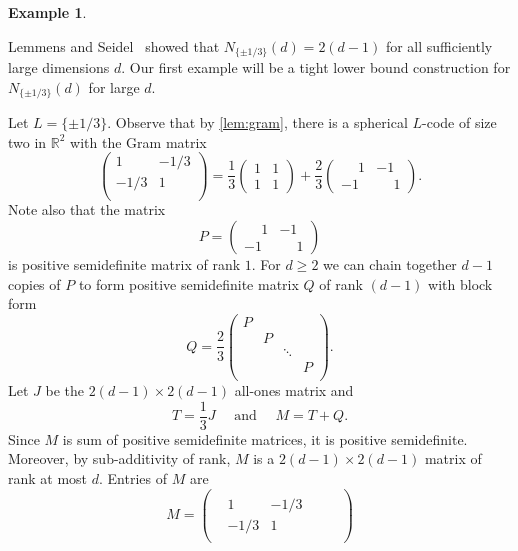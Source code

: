 \documentclass[reqno, 11pt]{amsart}
\theoremstyle{definition}
\newtheorem{example}[theorem]{Example}
\theoremstyle{remark}
\newcommand{\RR}{\mathbb{R}}
\begin{document}
\begin{example}\label{ex:equiangular-construction}

Lemmens and Seidel~\cite{LS73} showed that $N_{\{\pm 1/3\}}(d) = 2(d-1)$ for all sufficiently large dimensions $d$. Our first example will be a tight lower bound construction for $N_{\{\pm 1/3\}}(d)$ for large $d$. 

	Let $L = \{\pm 1/3\}$. Observe that by \cref{lem:gram}, there is a spherical $L$-code of size two in $\RR^2$ with the Gram matrix 
\[
	\begin{pmatrix}
		1 &  -1/3 \\
		-1/3 & 1 \\
	\end{pmatrix} = \frac{1}{3}\begin{pmatrix}
						 1 &  1 \\
						1 & 1 
						\end{pmatrix} + \frac{2}{3}\begin{pmatrix}
													 \phantom{+}1 &  -1 \\
													-1 & \phantom{+}1 
													\end{pmatrix}.
\]
Note also that the matrix
\[
	P = \begin{pmatrix}
		 \phantom{+}1 &  -1 \\
		-1 & \phantom{+}1 
		\end{pmatrix}
\]
is positive semidefinite matrix of rank $1$. For $d \geq 2$ we can chain together $d-1$ copies of $P$ to form positive semidefinite matrix $Q$ of rank $(d-1)$ with block form  
\[
	Q = \frac{2}{3}\begin{pmatrix}
		  P &  &  &  \\
		   & P &  &  \\
		   &  & \ddots &  \\
		   &  &  & P \\
		    	\end{pmatrix}.
\]
Let $J$ be the $2(d-1) \times 2(d-1)$ all-ones matrix and 
\[
	T = \frac{1}{3} J  \quad \text{ and } \quad M = T + Q.
\]
Since $M$ is sum of positive semidefinite matrices, it is positive semidefinite. Moreover, by sub-additivity of rank, $M$ is a $2(d-1) \times 2(d-1)$  matrix of rank at most $d$. Entries of $M$ are
\[
M = \begin{pmatrix}
    \begin{array}{cccc}
       \begin{matrix}
 		 1 & -1/3 \\
  		-1/3 & 1
  \end{matrix} & \begin{matrix}

\end{matrix}
\end{array}
\end{pmatrix}\]
\end{example}
\end{document}
